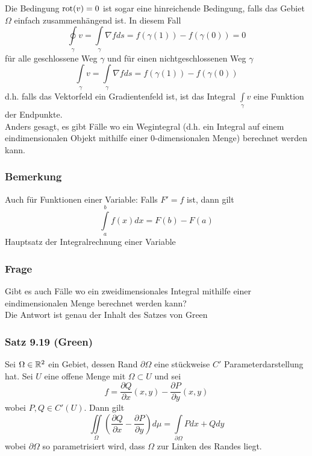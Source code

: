 Die Bedingung $\operatorname{rot}(v)=0$ ist sogar eine hinreichende Bedingung, falls das Gebiet $\Omega$ einfach zusammenhängend ist. In diesem Fall
\[\oint\limits_\gamma  v  = \int\limits_\gamma  {\nabla fds = f\left( {\gamma \left( 1 \right)} \right) - } f\left( {\gamma \left( 0 \right)} \right) = 0\]
für alle geschlossene Weg $\gamma$ und für einen nichtgeschlossenen Weg $\gamma$
\[\int\limits_\gamma  v  = \int\limits_\gamma  {\nabla fds = f\left( {\gamma \left( 1 \right)} \right) - } f\left( {\gamma \left( 0 \right)} \right)\]
d.h. falls das Vektorfeld ein Gradientenfeld ist, ist das Integral $\int\limits_\gamma  v $ eine Funktion der Endpunkte. \\

Anders gesagt, es gibt Fälle wo ein Wegintegral (d.h. ein Integral auf einem eindimensionalen Objekt mithilfe einer 0-dimensionalen Menge) berechnet werden kann.

\subsubsection*{Bemerkung}
Auch für Funktionen einer Variable: Falls $F'=f$ ist, dann gilt \[\int\limits_a^b {f(x)dx}  = F\left( b \right) - F\left( a \right)\] Hauptsatz der Integralrechnung einer Variable

\subsubsection*{Frage}
Gibt es auch Fälle wo ein zweidimensionales Integral mithilfe einer eindimensionalen Menge berechnet werden kann?\\

\noindent Die Antwort ist genau der Inhalt des Satzes von Green

\subsubsection*{Satz 9.19 (Green)}
Sei $\Omega \in\mathbb{R}^2$ ein Gebiet, dessen Rand $\partial\Omega$ eine stückweise $C'$ Parameterdarstellung hat. Sei $U$ eine offene Menge mit $\Omega\subset U$ und sei
\[ f=\frac{\partial Q}{\partial x}\left( x,y\right) -\frac{\partial P}{\partial y}\left( x,y\right) \]
wobei $P,Q\in C'\left( U\right)$. Dann gilt
\[ \iint\limits_\Omega \left(\frac{\partial Q}{\partial x}-\frac{\partial P}{\partial y}\right)d\mu = \int\limits_{\partial \Omega } {Pdx + Qdy} \]
wobei $\partial \Omega$ so parametrisiert wird, dass $\Omega$ zur Linken des Randes liegt. \\

